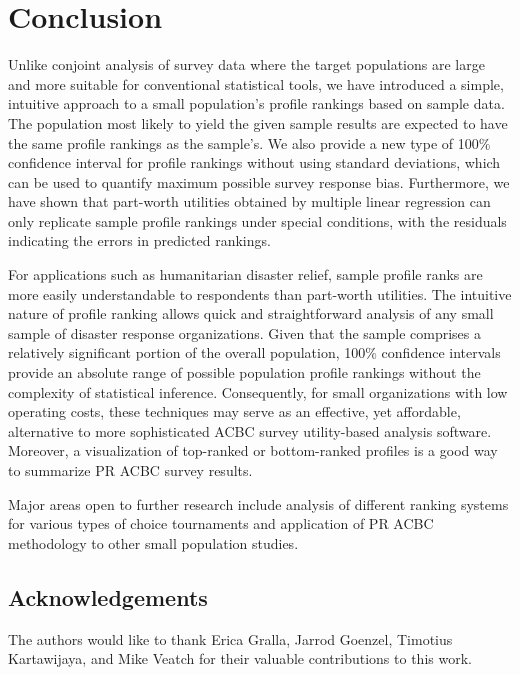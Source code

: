 \documentclass[a4paper, 12pt]{article}
\begin{document}
\section{Conclusion}
Unlike conjoint analysis of survey data where the target populations are large and more suitable for conventional statistical tools, we have introduced a simple, intuitive approach to a small population's profile rankings based on sample data. The population most likely to yield the given sample results are expected to have the same profile rankings as the sample's. We also provide a new type of 100\% confidence interval for profile rankings without using standard deviations, which can be used to quantify maximum possible survey response bias. Furthermore, we have shown that part-worth utilities obtained by multiple linear regression can only replicate sample profile rankings under special conditions, with the residuals indicating the errors in predicted rankings.

For applications such as humanitarian disaster relief, sample profile ranks are more easily understandable to respondents than part-worth utilities. The intuitive nature of profile ranking allows quick and straightforward analysis of any small sample of disaster response organizations. Given that the sample  comprises a relatively significant portion of the overall population, 100$\%$ confidence intervals provide an absolute range of possible population profile rankings without the complexity of statistical inference. Consequently, for small organizations with low operating costs, these techniques may serve as an effective, yet affordable, alternative to more sophisticated ACBC survey utility-based analysis software. Moreover, a visualization of top-ranked or bottom-ranked profiles is a good way to summarize PR ACBC survey results.

Major areas open to further research include analysis of  different ranking systems for various types of choice tournaments and application of PR ACBC methodology to other small population studies.



\subsection*{Acknowledgements}

The authors would like to thank
Erica Gralla, Jarrod Goenzel, Timotius Kartawijaya, and Mike Veatch for their valuable contributions to this work.
\end{document}
